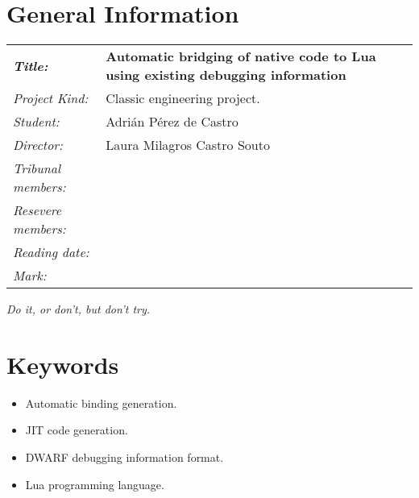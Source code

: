 \documentclass[a4paper,
	fontsize=12pt,
	titlepage=firstiscover,
	chapterprefix=false,
	appendixprefix=true,
	numbers=endperiod,
	twoside]{scrbook}
\newcommand\PfcTitle[0]{%
Automatic bridging of native code to Lua
using existing debugging information\relax}
\newcommand\PfcAuthor[0]{%
Adrián Pérez de Castro\relax}
\newcommand\PfcDirector[0]{%
Laura Milagros Castro Souto\relax}
\begin{document}
\frontmatter

\chapter*{General Information}

\vspace{1cm}
\begin{tabular}{p{}p{}}
	\textbf{\textit{Title:}} & \textbf{\PfcTitle} \vspace{0.5cm} \\
	\textit{Project Kind:} & Classic engineering project. \vspace{0.5cm} \\
	\textit{Student:}      & \PfcAuthor \vspace{0.5cm} \\
	\textit{Director:}     & \PfcDirector \vspace{0.5cm} \\
	\textit{Tribunal members:} & \vspace{3cm} \\
	\textit{Resevere members:} & \vspace{3cm} \\
	\textit{Reading date:} & \vspace{0.5cm}   \\
	\textit{Mark:} & \\
\end{tabular}



\begin{minipage}[t][6cm][l]{\textwidth}
	\vspace{10cm}
	\begin{flushright}
		\textit{Do it, or don't, but don't try.}
	\end{flushright}
\end{minipage}



\chapter*{Keywords}
\begin{itemize}
	\item Automatic binding generation.
	\item JIT code generation.
	\item DWARF debugging information format.
	\item Lua programming language.
\end{itemize}

\cleardoublepage
\tableofcontents
\listoffigures
\listoftables

\mainmatter



\end{document}
